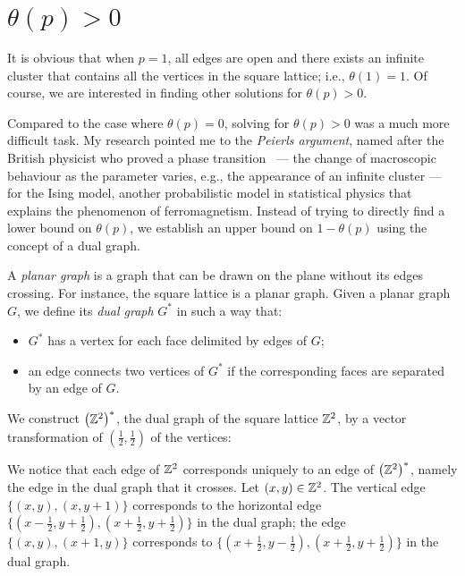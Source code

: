 \documentclass[a4paper, 12pt]{article}
\begin{document}
\section{$\theta(p) > 0$}\label{sec:yes_inf}
It is obvious that when $p = 1$, all edges are open and there exists an infinite cluster that contains all the vertices in the square lattice; i.e., $\theta(1) = 1$. Of course, we are interested in finding other solutions for $\theta(p) > 0$.

Compared to the case where $\theta(p) = 0$, solving for $\theta(p) > 0$ was a much more difficult task. My research pointed me to the \textit{Peierls argument}, named after the British physicist who proved a phase transition~\autocite*[477]{peierls_1936} --- the change of macroscopic behaviour as the parameter varies, e.g., the appearance of an infinite cluster --- for the Ising model, another probabilistic model in statistical physics that explains the phenomenon of ferromagnetism. Instead of trying to directly find a lower bound on $\theta(p)$, we establish an upper bound on $1 - \theta(p)$ using the concept of a dual graph.

\begin{defn}\label{defn:dual_graph}
A \textit{planar graph} is a graph that can be drawn on the plane without its edges crossing. For instance, the square lattice is a planar graph. Given a planar graph $G$, we define its \textit{dual graph} $G^*$ in such a way that:
\begin{itemize}
    \item $G^*$ has a vertex for each face delimited by edges of $G$;
    \item an edge connects two vertices of $G^*$ if the corresponding faces are separated by an edge of $G$.
\end{itemize}
\end{defn}

\begin{ex*}
    We construct $\left(\mathbb{Z}^2\right)^*$, the dual graph of the square lattice $\mathbb{Z}^2$, by a vector transformation of $(\frac{1}{2}, \frac{1}{2})$ of the vertices: 
    
    
    We notice that each edge of $\mathbb{Z}^2$ corresponds uniquely to an edge of $\left(\mathbb{Z}^2\right)^*$, namely the edge in the dual graph that it crosses. Let $(x, y) \in \mathbb{Z}^2$. The vertical edge $\{(x, y), (x, y + 1)\}$ corresponds to the horizontal edge $\{(x - \frac{1}{2}, y + \frac{1}{2}), (x + \frac{1}{2}, y + \frac{1}{2})\}$ in the dual graph; the edge $\{(x, y), (x + 1, y)\}$ corresponds to $\{(x + \frac{1}{2}, y - \frac{1}{2}), (x + \frac{1}{2}, y + \frac{1}{2})\}$ in the dual graph. 
\end{ex*}
\end{document}
